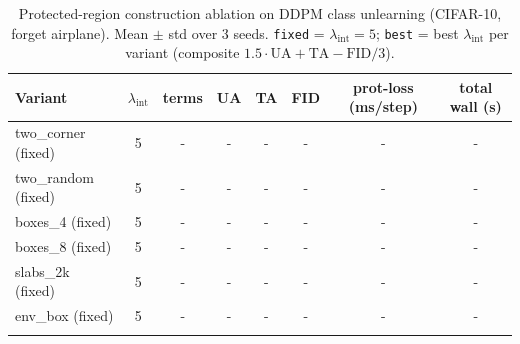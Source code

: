 \begin{table}[t]
\centering
\caption{Protected-region construction ablation on DDPM class unlearning (CIFAR-10, forget airplane). Mean $\pm$ std over 3 seeds. \texttt{fixed} = $\lambda_\mathrm{int}=5$; \texttt{best} = best $\lambda_\mathrm{int}$ per variant (composite $1.5\cdot\mathrm{UA} + \mathrm{TA} - \mathrm{FID}/3$).}
\label{tab:region-ablation}
\small
\begin{tabular}{l c c c c c c c}
\toprule
Variant & $\lambda_\mathrm{int}$ & terms & UA & TA & FID & prot-loss (ms/step) & total wall (s) \\
\midrule
two_corner (fixed) & 5 & - & - & - & - & - & - \\
\addlinespace
two_random (fixed) & 5 & - & - & - & - & - & - \\
\addlinespace
boxes_4 (fixed) & 5 & - & - & - & - & - & - \\
\addlinespace
boxes_8 (fixed) & 5 & - & - & - & - & - & - \\
\addlinespace
slabs_2k (fixed) & 5 & - & - & - & - & - & - \\
\addlinespace
env_box (fixed) & 5 & - & - & - & - & - & - \\
\addlinespace
\bottomrule
\end{tabular}
\end{table}
